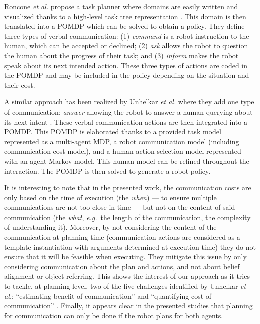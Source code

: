\documentclass[a4paper,11pt,twoside]{StyleThese}
\begin{document}
Roncone \textit{et al.} propose a task planner where domains are easily written and visualized thanks to a high-level task tree representation \cite{roncone2017transparent}. This domain is then translated into a POMDP which can be solved to obtain a policy. They define three types of verbal communication: (1) \textit{command} is a robot instruction to the human, which can be accepted or declined; (2) \textit{ask} allows the robot to question the human about the progress of their task; and (3) \textit{inform} makes the robot speak about its next intended action. These three types of actions are coded in the POMDP and may be included in the policy depending on the situation and their cost.

A similar approach has been realized by Unhelkar \textit{et al.} where they add one type of communication: \textit{answer} allowing the robot to answer a human querying about its next intent \cite{unhelkar2020decision}. These verbal communication actions are then integrated into a POMDP. This POMDP is elaborated thanks to a provided task model represented as a multi-agent MDP, a robot communication model (including communication cost model), and a human action selection model represented with an agent Markov model. This human model can be refined throughout the interaction. The POMDP is then solved to generate a robot policy.

It is interesting to note that in the presented work, the communication costs are only based on the time of execution (the \textit{when}) --- to ensure multiple communications are not too close in time --- but not on the content of said communication (the \textit{what}, \textit{e.g.}~the length of the communication, the complexity of understanding it). Moreover, by not considering the content of the communication at planning time (communication actions are considered as a template instantiation with arguments determined at execution time) they do not ensure that it will be feasible when executing. They mitigate this issue by only considering communication about the plan and actions, and not about belief alignment or object referring. This shows the interest of our approach as it tries to tackle, at planning level, two of the five challenges identified by Unhelkar \textit{et al.}: ``estimating benefit of communication'' and ``quantifying cost of communication'' \cite{unhelkar2017challenges}.
Finally, it appears clear in the presented studies that planning for communication can only be done if the robot plans for both agents.
\end{document}

